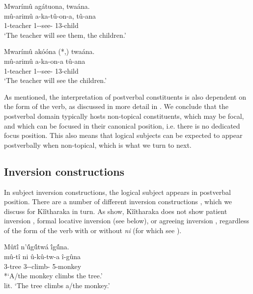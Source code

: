 \documentclass[output=paper]{langscibook}
\begin{document}
\ea
\label{bkm:Ref119918608}
\ea
Mwarímû agátuona, twaána.\\
\gll
mû-arimû  a-ka-tû-on-a,  tû-ana\\
1-teacher 1\SM{}-\OM{}-see-\FV{}  13-child\\
\glt
‘The teacher will see them, the children.’

\ex
Mwarímû akóóna (*,) twaána.\\
\gll
mû-arimû  a-ka-on-a  tû-ana\\
1-teacher 1\SM-\FUT{}-see-\FV{}  13-child\\
\glt
‘The teacher will see the children.’

\z
\z


As mentioned, the interpretation of postverbal constituents is also dependent on the form of the verb, as discussed in more detail in . We conclude that the postverbal domain typically hosts non-topical constituents, which may be focal, and which can be focused in their canonical position, i.e. there is no dedicated focus position. This also means that logical subjects can be expected to appear postverbally when non-topical, which is what we turn to next.

\subsection{Inversion constructions}
\label{bkm:Ref94457814}
In subject inversion constructions, the logical subject appears in postverbal position. There are a number of different inversion constructions \citep[see][]{MartenvanderWal2014}, which we discuss for Kîîtharaka in turn. As \citet{BuellMuriungi2008} show, Kîîtharaka does not show patient inversion , formal locative inversion (see below), or agreeing inversion , regardless of the form of the verb with or without \textit{ni} (for which see ).

\ea
\label{monkey}
\ea
Mût\'{î} n’\'{û}g\'{û}tw\'{a} \'{î}g\'{û}na.\\
\gll
mû-tî  ni  û-kû-tw-a  î-gûna\\
3-tree \FOC{} 3\SM-\PRS{}-climb-\FV{} 5-monkey\\
\glt
*`A/the monkey climbs the tree.’\\
 lit. ‘The tree climbs a/the monkey.’
\end{document}
